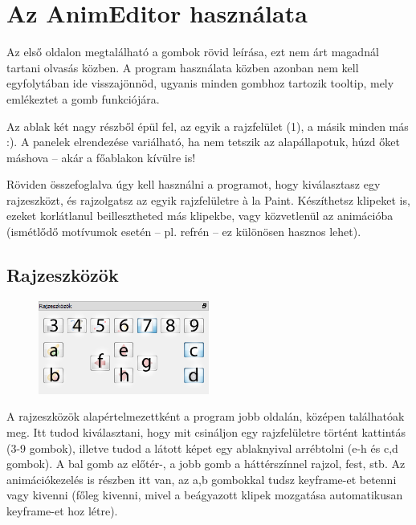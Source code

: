 \documentclass[a4paper,12pt,release]{article}
\begin{document}
\section{Az AnimEditor használata}
Az első oldalon megtalálható a gombok rövid leírása, ezt nem árt magadnál tartani olvasás közben. A program használata közben azonban nem kell egyfolytában ide visszajönnöd, ugyanis minden gombhoz tartozik tooltip, mely emlékeztet a gomb funkciójára.

Az ablak két nagy részből épül fel, az egyik a rajzfelület (1), a másik minden más :). A panelek elrendezése variálható, ha nem tetszik az alapállapotuk, húzd őket máshova -- akár a főablakon kívülre is!

Röviden összefoglalva úgy kell használni a programot, hogy kiválasztasz egy rajzeszközt, és rajzolgatsz az egyik rajzfelületre \`a la Paint. Készíthetsz klipeket is, ezeket korlátlanul beillesztheted más klipekbe, vagy közvetlenül az animációba (ismétlődő motívumok esetén -- pl. refrén -- ez különösen hasznos lehet).

\subsection{Rajzeszközök}
\begin{figure}
	\vspace{-27pt}
	\begin{center}
		\includegraphics[width=0.5\textwidth]{pics/tools.png}
	\end{center}
	\vspace{-20pt}
\end{figure}
A rajzeszközök alapértelmezettként a program jobb oldalán, középen találhatóak meg. Itt tudod kiválasztani, hogy mit csináljon egy rajzfelületre történt kattintás (3-9 gombok), illetve tudod a látott képet egy ablaknyival arrébtolni (e-h és c,d gombok). A bal gomb az előtér-, a jobb gomb a háttérszínnel rajzol, fest, stb. Az animációkezelés is részben itt van, az a,b gombokkal tudsz keyframe-et betenni vagy kivenni (főleg kivenni, mivel a beágyazott klipek mozgatása automatikusan keyframe-et hoz létre).
\end{document}
